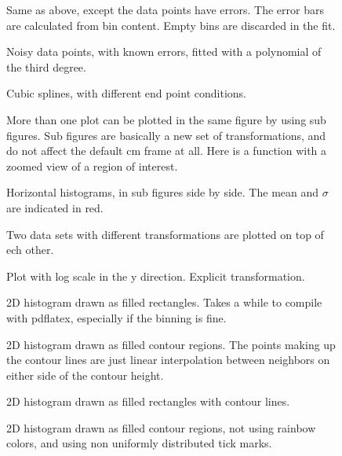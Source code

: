 \documentclass{article}
\begin{document}
\begin{figure}[H]
\centering

\caption{Same as above, except the data points have errors. The error bars are calculated from bin content.
Empty bins are discarded in the fit.}
\end{figure}
\begin{figure}[H]
\centering

\caption{Noisy data points, with known errors, fitted with a polynomial of the third degree.}
\end{figure}
\begin{figure}[H]
\centering

\caption{Cubic splines, with different end point conditions.}
\end{figure}
\begin{figure}[H]
\centering

\caption{More than one plot can be plotted in the same figure by using sub figures.
Sub figures are basically a new set of transformations, and do not affect the default cm frame at all.
Here is a function with a zoomed view of a region of interest.}
\end{figure}
\begin{figure}[H]
\centering

\caption{Horizontal histograms, in sub figures side by side. The mean and $\sigma$ are indicated in red.}
\end{figure}
\begin{figure}[H]
\centering

\caption{Two data sets with different transformations are plotted on top of ech other.}
\end{figure}
\begin{figure}[H]
\centering

\caption{Plot with log scale in the y direction. Explicit transformation.}
\end{figure}
\begin{figure}[H]
\centering

\caption{2D histogram drawn as filled rectangles. Takes a while to compile with pdflatex, 
especially if the binning is fine.}
\end{figure}
\begin{figure}[H]
\centering

\caption{2D histogram drawn as filled contour regions. The points making up the contour lines 
are just linear interpolation between neighbors on either side of the contour height.}
\end{figure}
\begin{figure}[H]
\centering

\caption{2D histogram drawn as filled rectangles with contour lines.}
\end{figure}
\begin{figure}[H]
\centering

\caption{2D histogram drawn as filled contour regions, not using rainbow colors, and using
non uniformly distributed tick marks.}
\end{figure}
\end{document}
